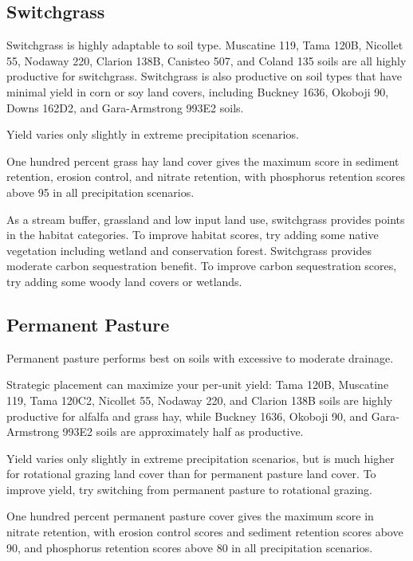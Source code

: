 \documentclass[11pt]{article}
\begin{document}
\subsection{Switchgrass}

Switchgrass is highly adaptable to soil type. Muscatine 119, Tama 120B, Nicollet 55, Nodaway 220, Clarion 138B, Canisteo 507, and Coland 135 soils are all highly productive for switchgrass. Switchgrass is also productive on soil types that have minimal yield in corn or soy land covers, including Buckney 1636, Okoboji 90, Downs 162D2, and Gara-Armstrong 993E2 soils.

Yield varies only slightly in extreme precipitation scenarios.

One hundred percent grass hay land cover gives the maximum score in sediment retention, erosion control, and nitrate retention, with phosphorus retention scores above 95 in all precipitation scenarios.

As a stream buffer, grassland and low input land use, switchgrass provides points in the habitat categories. To improve habitat scores, try adding some native vegetation including wetland and conservation forest. Switchgrass provides moderate carbon sequestration benefit.  To improve carbon sequestration scores, try adding some woody land covers or wetlands.

\subsection{Permanent Pasture}

Permanent pasture performs best on soils with excessive to moderate drainage.

Strategic placement can maximize your per-unit yield: Tama 120B, Muscatine 119, Tama 120C2, Nicollet 55, Nodaway 220, and Clarion 138B soils are highly productive for alfalfa and grass hay, while Buckney 1636, Okoboji 90, and Gara-Armstrong 993E2 soils are approximately half as productive.

Yield varies only slightly in extreme precipitation scenarios, but is much higher for rotational grazing land cover than for permanent pasture land cover. To improve yield, try switching from permanent pasture to rotational grazing.

One hundred percent permanent pasture cover gives the maximum score in nitrate retention, with erosion control scores and sediment retention scores above 90, and phosphorus retention scores above 80 in all precipitation scenarios. 
\end{document}
